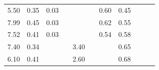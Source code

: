 \begin{refsection}[referencesCh3]
\begin{table}
\begin{adjustbox}{scale=0.65,center}
\begin{tabular}{@{}ccccccccccc@{}}
		5.50                                                         & 0.35                                                & 0.03                                                &                                                     &                                                     &                                                      & 0.60                                                & 0.45                                                  &                                                         &                                                      & \cite{ADAS}            \\
		7.99                                                         & 0.45                                                & 0.03                                                &                                                     &                                                     &                                                      & 0.62                                                & 0.55                                                  &                                                         &                                                      & \cite{ADAS}            \\
		7.52                                                         & 0.41                                                & 0.03                                                &                                                     &                                                     &                                                      & 0.54                                                & 0.58                                                  &                                                         &                                                      & \cite{ADAS}            \\
		7.40                                                         & 0.34                                                &                                                     &                                                     & 3.40                                                &                                                      &                                                     & 0.65                                                  &                                                         &                                                      & \cite{Risgberg}                               \\
		6.10                                                         & 0.41                                                &                                                     &                                                     & 2.60                                                &                                                      &                                                     & 0.68                                                  &                                                         &                                                      & \cite{Risgberg}                                \\

\end{tabular}
\end{adjustbox}
\end{table}
\end{refsection}
